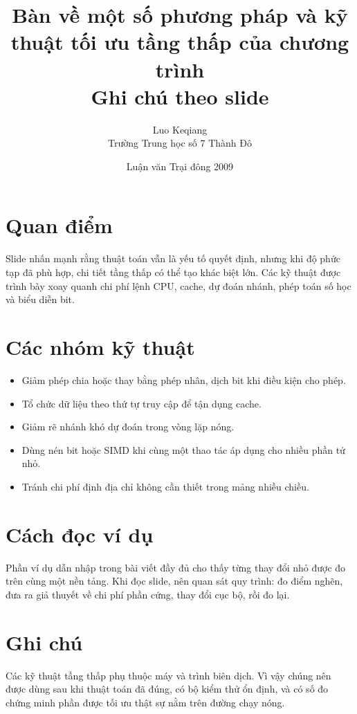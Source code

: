 \documentclass[11pt]{article}
\title{Bàn về một số phương pháp và kỹ thuật tối ưu tầng thấp của chương trình\\{\large Ghi chú theo slide}}
\author{Luo Keqiang\\Trường Trung học số 7 Thành Đô}
\date{Luận văn Trại đông 2009}
\begin{document}
\maketitle


\section{Quan điểm}

Slide nhấn mạnh rằng thuật toán vẫn là yếu tố quyết định, nhưng khi độ phức
tạp đã phù hợp, chi tiết tầng thấp có thể tạo khác biệt lớn. Các kỹ thuật được
trình bày xoay quanh chi phí lệnh CPU, cache, dự đoán nhánh, phép toán số học
và biểu diễn bit.

\section{Các nhóm kỹ thuật}

\begin{itemize}
  \item Giảm phép chia hoặc thay bằng phép nhân, dịch bit khi điều kiện cho
  phép.
  \item Tổ chức dữ liệu theo thứ tự truy cập để tận dụng cache.
  \item Giảm rẽ nhánh khó dự đoán trong vòng lặp nóng.
  \item Dùng nén bit hoặc SIMD khi cùng một thao tác áp dụng cho nhiều phần
  tử nhỏ.
  \item Tránh chi phí định địa chỉ không cần thiết trong mảng nhiều chiều.
\end{itemize}

\section{Cách đọc ví dụ}

Phần ví dụ dẫn nhập trong bài viết đầy đủ cho thấy từng thay đổi nhỏ được đo
trên cùng một nền tảng. Khi đọc slide, nên quan sát quy trình: đo điểm nghẽn,
đưa ra giả thuyết về chi phí phần cứng, thay đổi cục bộ, rồi đo lại.

\section{Ghi chú}

Các kỹ thuật tầng thấp phụ thuộc máy và trình biên dịch. Vì vậy chúng nên được
dùng sau khi thuật toán đã đúng, có bộ kiểm thử ổn định, và có số đo chứng
minh phần được tối ưu thật sự nằm trên đường chạy nóng.
\end{document}
